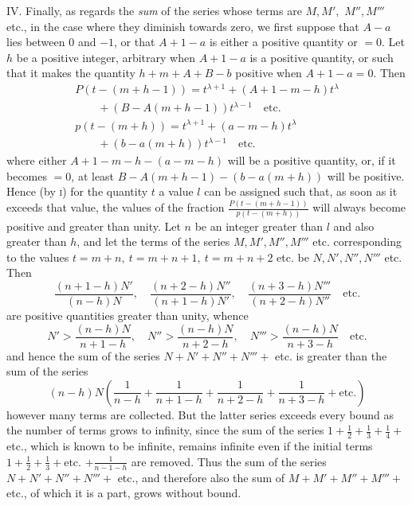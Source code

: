 IV. Finally, as regards the \textit{sum} of the series whose terms are $M,M',$ $M'',M'''$ etc., in the case where they diminish towards zero, we first suppose that $A-a$ lies between $0$ and $-1$, or that $A+1-a$ is either a positive quantity or $=0$. Let $h$ be a positive integer, arbitrary when $A+1-a$ is a positive quantity, or such that it makes the quantity $h+m+A+B-b$ positive when $A+1-a=0$. Then
\[
\begin{array}{l}
P(t-(m+h-1))=t^{\lambda+1}+(A+1-m-h)t^\lambda\\\qquad{}+(B-A(m+h-1))t^{\lambda-1}\quad\mathrm{etc.}\\
p(t-(m+h))=t^{\lambda+1}+(a-m-h)t^\lambda\\\qquad{}+(b-a(m+h))t^{\lambda-1}\quad\mathrm{etc.}
\end{array}
\]
where either $A+1-m-h-(a-m-h)$ will be a positive quantity, or, if it becomes $=0$, at least $B-A(m+h-1)-(b-a(m+h))$ will be positive. Hence (by \textsc{i}) for the quantity $t$ a value $l$ can be assigned such that, as soon as it exceeds that value, the values of the fraction $\frac{P(t-(m+h-1))}{p(t-(m+h))}$ will always become positive and greater than unity. Let $n$ be an integer
greater than $l$ and also greater than $h$, and let the terms of the series $M,M',M'',M'''$ etc. corresponding to the values $t=m+n,\ t=m+n+1,\ t=m+n+2$ etc. be $N,N',N'',N'''$ etc. Then
\[
\frac{(n+1-h)N'}{(n-h)N},\quad
\frac{(n+2-h)N''}{(n+1-h)N'},\quad
\frac{(n+3-h)N'''}{(n+2-h)N''}\quad\mathrm{etc.}
\]
are positive quantities greater than unity, whence
\[
N'>\frac{(n-h)N}{n+1-h},\quad
N''>\frac{(n-h)N}{n+2-h},\quad
N'''>\frac{(n-h)N}{n+3-h}\quad\mathrm{etc.}
\]
and hence the sum of the series $N+N'+N''+N'''+$ etc. is greater than the sum of the series
\[
(n-h)N\left(\frac{1}{n-h}+\frac{1}{n+1-h}+\frac{1}{n+2-h}+\frac{1}{n+3-h}+\mathrm{etc.}\right)
\]
however many terms are collected. But the latter series exceeds every bound as the number of terms grows to infinity, since the sum of the series $1+\frac12+\frac13+\frac14+$ etc., which is known to be infinite, remains infinite even if the initial terms $1+\frac12+\frac13+\mathrm{etc.}$ $+\frac{1}{n-1-h}$ are removed. Thus the sum of the series $N+N'+N''+N'''+$ etc., and therefore also the sum of $M+M'+M''+M'''+$ etc., of which it is a part, grows without bound.

